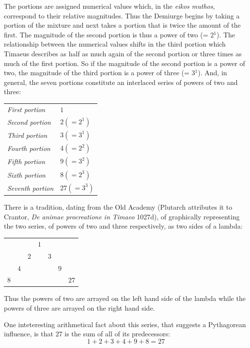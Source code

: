 The portions are assigned numerical values which, in the \emph{eikos muthos}, correspond to their relative magnitudes. Thus the Demiurge begins by taking a portion of the mixture and next takes a portion that is twice the amount of the first. The magnitude of the second portion is thus a power of two (= 2\( ^1 \)). The relationship between the numerical values shifts in the third portion which Timaeus describes as half as much again of the second portion or three times as much of the first portion. So if the magnitude of the second portion is a power of two, the magnitude of the third portion is a power of three (= 3\( ^1 \)). And, in general, the seven portions constitute an interlaced series of powers of two and three:
\begin{center}
	\begin{tabular}{l l}
		\emph{First portion} & \( 1 \)\\
		\emph{Second portion} & \( 2 (= 2^1) \)\\
		\emph{Third portion} & \( 3 (= 3^1) \)\\
		\emph{Fourth portion} & \( 4 (= 2^2) \)\\
		\emph{Fifth portion} & \( 9 (= 3^2) \)\\
		\emph{Sixth portion} & \( 8 (= 2^3) \)\\
		\emph{Seventh portion} & \( 27 (= 3^3) \)\\
	\end{tabular}
\end{center}
There is a tradition, dating from the Old Academy (Plutarch attributes it to Crantor, \emph{De animae procreatione in Timaeo} 1027d), of graphically representing the two series, of powers of two and three respectively, as two sides of a lambda:
\begin{center}
	\begin{tabular}{c c c c c c c}
		 & & & \( 1 \) & & &\\
		 & & \( 2 \) & & \( 3 \) &\\
		 & \( 4 \) & & & & \( 9 \)\\
		 \( 8 \) & & & & & & \( 27 \)
	\end{tabular}
\end{center}
Thus the powers of two are arrayed on the left hand side of the lambda while the powers of three are arrayed on the right hand side. 

One inteteresting arithmetical fact about this series, that suggests a Pythagorean influence, is that 27 is the sum of all of its predecessors:
\[
	1 + 2 + 3 + 4 + 9 + 8 = 27
\]

